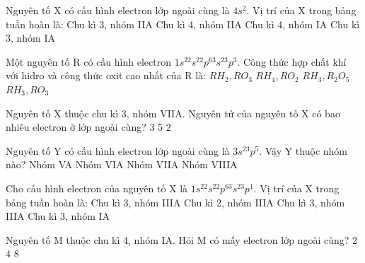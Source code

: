 \begin{ex}[1 điểm]
Nguyên tố X có cấu hình electron lớp ngoài cùng là $4s^2$. Vị trí của X trong bảng tuần hoàn là:
    \choice
    {Chu kì 3, nhóm IIA}
    {\True Chu kì 4, nhóm IIA}
    {Chu kì 4, nhóm IA}
    {Chu kì 3, nhóm IA}
\end{ex}

\begin{ex}[1 điểm]
Một nguyên tố R có cấu hình electron $1s^22s^22p^63s^23p^3$. Công thức hợp chất khí với hidro và công thức oxit cao nhất của R là:
    \choice
    {$RH_2, RO_3$}
    {$RH_4, RO_2$}
    {\True $RH_3, R_2O_5$}
    {$RH_3, RO_3$}
\end{ex}

\begin{ex}[1 điểm]
Nguyên tố X thuộc chu kì 3, nhóm VIIA. Nguyên tử của nguyên tố X có bao nhiêu electron ở lớp ngoài cùng?
    \choice
    {3}
    {5}
    {}
    {2}
\end{ex}

\begin{ex}[1 điểm]
Nguyên tố Y có cấu hình electron lớp ngoài cùng là $3s^23p^5$. Vậy Y thuộc nhóm nào?
    \choice
    {Nhóm VA}
    {Nhóm VIA}
    {\True Nhóm VIIA}
    {Nhóm VIIIA}
\end{ex}

\begin{ex}[1 điểm]
Cho cấu hình electron của nguyên tố X là $1s^22s^22p^63s^23p^1$. Vị trí của X trong bảng tuần hoàn là:
    \choice
    {Chu kì 3, nhóm IIIA}
    {Chu kì 2, nhóm IIIA}
    {\True Chu kì 3, nhóm IIIA}
    {Chu kì 3, nhóm IA}
\end{ex}


\begin{ex}[1 điểm]
Nguyên tố M thuộc chu kì 4, nhóm IA. Hỏi M có mấy electron lớp ngoài cùng?
    \choice
    {2}
    {4}
    {8}
    {}
\end{ex}

